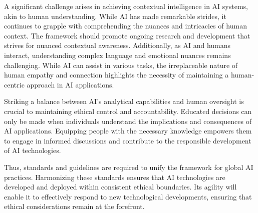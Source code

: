 \documentclass{article}
\begin{document}
A significant challenge arises in achieving contextual intelligence in AI systems, akin to human understanding. While AI has made remarkable strides, it continues to grapple with comprehending the nuances and intricacies of human context. The framework should promote ongoing research and development that strives for nuanced contextual awareness. Additionally, as AI and humans interact, understanding complex language and emotional nuances remains challenging. While AI can assist in various tasks, the irreplaceable nature of human empathy and connection highlights the necessity of maintaining a human-centric approach in AI applications.

Striking a balance between AI's analytical capabilities and human oversight is crucial to maintaining ethical control and accountability. Educated decisions can only be made when individuals understand the implications and consequences of AI applications. Equipping people with the necessary knowledge empowers them to engage in informed discussions and contribute to the responsible development of AI technologies.

Thus, standards and guidelines are required to unify the framework for global AI practices. Harmonizing these standards ensures that AI technologies are developed and deployed within consistent ethical boundaries. Its agility will enable it to effectively respond to new technological developments, ensuring that ethical considerations remain at the forefront.








%
\end{document}
